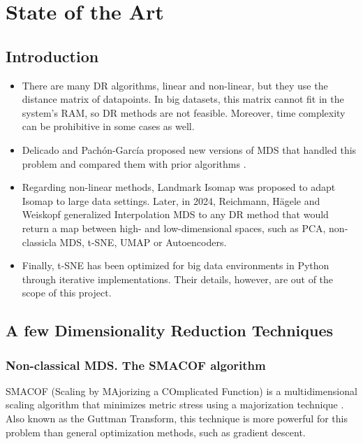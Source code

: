 \section{State of the Art}

\subsection{Introduction}

\begin{itemize}
    \item There are many DR algorithms, linear and non-linear, but they use the distance matrix of datapoints. In big datasets, this matrix cannot fit in the system's RAM, so DR methods are not feasible. Moreover, time complexity can be prohibitive in some cases as well.
    \item Delicado and Pachón-García proposed new versions of MDS that handled this problem and compared them with prior algorithms \cite{Delicado2024MDSBigData}.
    \item Regarding non-linear methods, Landmark Isomap \cite{deSilvaTenenbaum2002} was proposed to adapt Isomap to large data settings. Later, in 2024, Reichmann, Hägele and Weiskopf generalized Interpolation MDS to any DR method that would return a map between high- and low-dimensional spaces, such as PCA, non-classicla MDS, t-SNE, UMAP or Autoencoders.
    \item Finally, t-SNE has been optimized for big data environments in Python through iterative implementations. Their details, however, are out of the scope of this project.
\end{itemize}

\subsection{A few Dimensionality Reduction Techniques}

\subsubsection{Non-classical MDS. The SMACOF algorithm}

SMACOF (Scaling by MAjorizing a COmplicated Function) is a multidimensional scaling algorithm that minimizes metric stress using a majorization technique \cite{borg1997modern}. Also known as the Guttman Transform, this technique is more powerful for this problem than general optimization methods, such as gradient descent.


